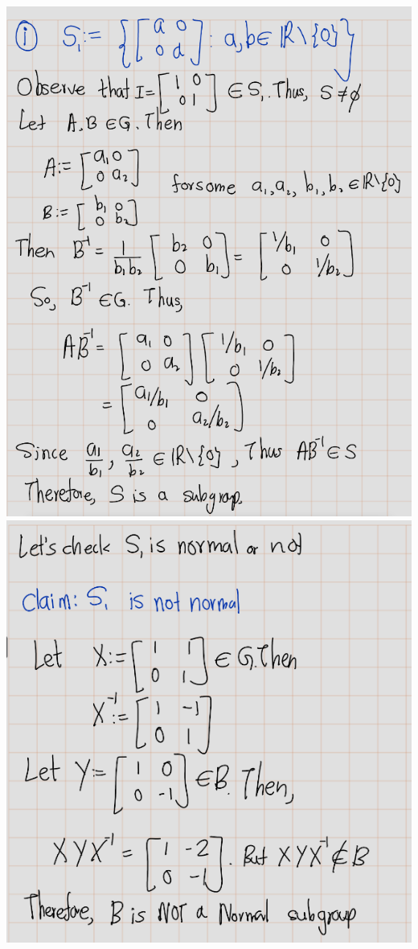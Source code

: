 \documentclass[
]{book}
\begin{document}
\includegraphics{figures/ch_2/fig40.png}
\includegraphics{figures/ch_2/fig41.png}
\end{document}
